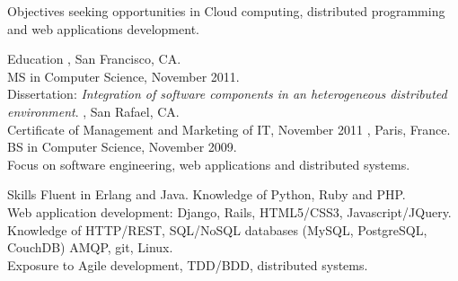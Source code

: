 \documentclass{resume}
\author{~~~~~~Edouard Swiac}
\begin{document}
\maketitle

\begin{category}{Objectives}
 seeking opportunities in Cloud computing, distributed programming and web applications development.
\end{category}


\begin{category}{Education}
, San Francisco, CA.
\\MS in Computer Science, November 2011.
\\Dissertation: \emph{Integration of software components in an heterogeneous distributed environment}.
, San Rafael, CA.
\\Certificate of Management and Marketing of IT, November 2011
, Paris, France.
\\BS in Computer Science, November 2009.
\\Focus on software engineering, web applications and distributed systems.
\end{category}


\begin{category}{Skills}
\citemnobullet 
Fluent in Erlang and Java. Knowledge of Python, Ruby and PHP.
\\Web application development: Django, Rails, HTML5/CSS3, Javascript/JQuery.
\\Knowledge of HTTP/REST, SQL/NoSQL databases (MySQL, PostgreSQL, CouchDB) AMQP, git, Linux.
\\Exposure to Agile development, TDD/BDD, distributed systems.
\end{category}
\end{document}
